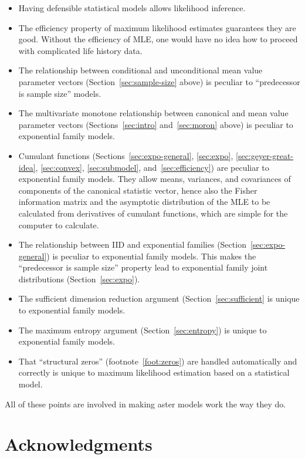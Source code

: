 \documentclass[11pt]{article}
\begin{document}
\begin{itemize}
\item Having defensible statistical models allows likelihood inference.
\item The efficiency property of maximum likelihood estimates guarantees
    they are good.  Without the efficiency of MLE, one would have no idea
    how to proceed with complicated life history data.
\item The relationship between conditional and unconditional mean value
    parameter vectors (Section~\ref{sec:sample-size} above) is peculiar
    to ``predecessor is sample size'' models.
\item The multivariate monotone relationship between canonical and mean value
    parameter vectors (Sections~\ref{sec:intro} and~\ref{sec:moron} above)
    is peculiar to exponential family models.
\item Cumulant functions (Sections~\ref{sec:expo-general}, \ref{sec:expo},
    \ref{sec:geyer-great-idea}, \ref{sec:convex}, \ref{sec:submodel},
    and~\ref{sec:efficiency}) are peculiar to exponential family models.
    They allow means, variances, and covariances of components of the
    canonical statistic vector, hence also the Fisher information matrix
    and the asymptotic distribution of the MLE to be calculated from
    derivatives of cumulant functions, which are simple for the computer
    to calculate.
\item The relationship between IID and exponential families
    (Section~\ref{sec:expo-general}) is peculiar to exponential family models.
    This makes the ``predecessor is sample size'' property lead to exponential
    family joint distributions (Section~\ref{sec:expo}).
\item The sufficient dimension reduction argument (Section~\ref{sec:sufficient}
    is unique to exponential family models.
\item The maximum entropy argument (Section~\ref{sec:entropy})
    is unique to exponential family models.
\item That ``structural zeros'' (footnote~\ref{foot:zeros}) are handled
    automatically and correctly is unique to maximum likelihood estimation
    based on a statistical model.
\end{itemize}
All of these points are involved in making aster models work the way they do.

\section*{Acknowledgments}
\end{document}
